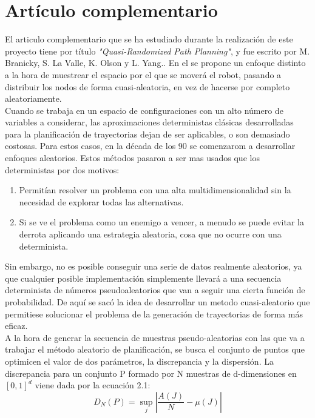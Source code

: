 \section{Artículo complementario}
\label{articulo_complementario}


El articulo complementario que se ha estudiado durante la realización de este proyecto tiene por título \textsl{"Quasi-Randomized Path Planning"}, y fue escrito por M. Branicky, S. La Valle, K. Olson y L. Yang.. En el se propone un enfoque distinto a la hora de muestrear el espacio por el que se moverá el robot, pasando a distribuir los nodos de forma cuasi-aleatoria, en vez de hacerse por completo aleatoriamente.
\\

Cuando se trabaja en un espacio de configuraciones con un alto número de variables a considerar, las aproximaciones deterministas clásicas desarrolladas para la planificación de trayectorias dejan de ser aplicables, o son demasiado costosas. Para estos casos, en la década de los 90 se comenzarom a desarrollar enfoques aleatorios. Estos métodos pasaron a ser mas usados que los deterministas por dos motivos:
\begin{enumerate}
\item Permitían resolver un problema con una alta multidimensionalidad sin la necesidad de explorar todas las alternativas.
\item Si se ve el problema como un enemigo a vencer, a menudo se puede evitar la derrota aplicando una estrategia aleatoria, cosa que no ocurre con una determinista. 
\end{enumerate}  

Sin embargo, no es posible conseguir una serie de datos realmente aleatorios, ya que cualquier posible implementación simplemente llevará a una secuencia determinista de números pseudoaleatorios que van a seguir una cierta función de probabilidad. De aquí se sacó la idea de desarrollar un metodo cuasi-aleatorio que permitiese solucionar el problema de la generación de trayectorias de forma más eficaz. 
\\

A la hora de generar la secuencia de muestras pseudo-aleatorias con las que va a trabajar el método aleatorio de planificación, se busca el conjunto de puntos que optimicen el valor de dos parámetros, la discrepancia y la dispersión. La discrepancia para un conjunto P formado por N muestras de d-dimensiones en $[0,1]^{d}$  viene dada por la ecuación 2.1:
\begin{equation}
D_{N}(P) = \sup_{j} |\frac{A(J)}{N}-\mu(J)|
\end{equation} 

